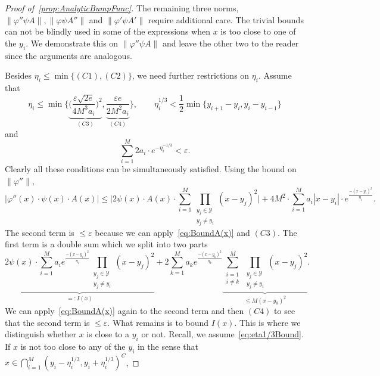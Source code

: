 \documentclass[12pt,]{article}
\def\cref#1{\ref{#1}}%
\theoremstyle{definition}
\theoremstyle{remark}
\newcommand{\0}{\mathbf{0}}
\begin{document}
\begin{proof}[Proof of~\cref{prop:AnalyticBumpFunc}]
The remaining three norms, $\|\varphi'' \psi A\|,\|\varphi \psi A''\|$ and $\|\varphi' \psi A'\|$
require additional care. The trivial bounds can not be blindly used in some of the expressions when
$x$ is too close to one of the $y_i$. We demonstrate this on $\|\varphi'' \psi A\|$ and leave the
other two to the reader since the arguments are analogous.

Besides $\eta_i\leq\min\{(C1),(C2)\}$, we need further restrictions on $\eta_i$. Assume that
\begin{equation}\label{eq:eta1/3Bound}
	\eta_i\leq \min \bigg\{ \underbrace{ \Big( \frac{\varepsilon\sqrt{2e}}{4M^3a_i} \Big)^2
	}_{(C3)}, \underbrace{ \frac{\varepsilon e}{2M^2a_i} }_{(C4)} \bigg\},\qquad
	\eta_i^{1/3} < \frac{1}{2} \min\big\{ y_{i+1}-y_i, y_i-y_{i-1} \big\} 
\end{equation}
and
\begin{equation}\label{eq:etaOtherBound}
	\sum_{i=1}^M 2a_i\cdot e^{-\eta_i^{-1/3}} < \varepsilon.
\end{equation}
Clearly all these conditions can be simultaneously satisfied. Using the bound on $\|\varphi''\|$,
\begin{equation*}
	\big|\varphi''(x)\cdot \psi(x)\cdot A(x)\big|\leq  \bigg| 2\psi(x)\cdot A(x)\cdot
	\sum_{i=1}^{M}  \prod_{\substack{y_j\in\mathcal{Y}\\ y_j\neq y_i}} (x-y_j)^2 \bigg| +
	4M^2\cdot \sum_{i=1}^{M} a_i|x-y_i| \cdot e^{\frac{-(x-y_i)^2}{\eta_i}}.
\end{equation*}
The second term is $\leq \varepsilon$ because we can apply~\cref{eq:BoundA(x)} and $(C3)$. The first
term is a double sum which we split into two parts
\begin{equation*}
	\underbrace{2\psi(x)\cdot  \sum_{i=1}^{M} a_i e^{\frac{-(x-y_i)^2}{\eta_i}}
	\prod_{\substack{y_j\in\mathcal{Y}\\ y_j\neq y_i}} (x-y_j)^2}_{=: I(x)} +
	2 \sum_{k=1}^{M}  a_k  e^{\frac{-(x-y_k)^2}{\eta_k}} \underbrace{\sum_{\substack{i=1 \\
	i\neq k}}^{M} \prod_{\substack{y_j\in\mathcal{Y}\\ y_j\neq y_i}} (x-y_j)^2}_{\leq
      M(x-y_k)^2}.
\end{equation*} 
We can apply~\cref{eq:BoundA(x)} again to the second term and then $(C4)$ to see that the second
term is $\leq \varepsilon$. What remains is to bound $I(x)$. This is where we distinguish whether
$x$ is close to a $y_i$ or not. Recall, we assume~\cref{eq:eta1/3Bound}. If $x$ is not too close to
any of the $y_i$ in the sense that $x\in\bigcap_{i=1}^M (y_i-\eta_i^{1/3}, y_i+\eta_i^{1/3})^C$,

\end{proof}
\end{document}
